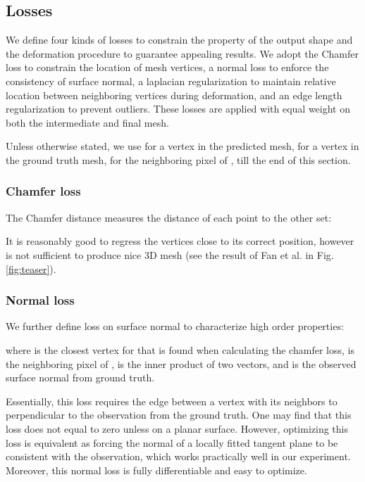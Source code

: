 \documentclass[runningheads]{llncs}
\newcommand{\figref}[1]{Fig. \ref{#1}}
\begin{document}
\subsection{Losses}
We define four kinds of losses to constrain the property of the output shape and the deformation procedure to guarantee appealing results.
We adopt the Chamfer loss \cite{FanSG16} to constrain the location of mesh vertices, a normal loss to enforce the consistency of surface normal, a laplacian regularization to maintain relative location between neighboring vertices during deformation, and an edge length regularization to prevent outliers. 
These losses are applied with equal weight on both the intermediate and final mesh.

Unless otherwise stated, we use  for a vertex in the predicted mesh,  for a vertex in the ground truth mesh,  for the neighboring pixel of , till the end of this section.





\subsubsection{Chamfer loss}
The Chamfer distance measures the distance of each point to the other set:

It is reasonably good to regress the vertices close to its correct position, however is not sufficient to produce nice 3D mesh (see the result of Fan et al. \cite{FanSG16} in \figref{fig:teaser}).

\subsubsection{Normal loss}
We further define loss on surface normal to characterize high order properties:

where  is the closest vertex for  that is found when calculating the chamfer loss,  is the neighboring pixel of ,  is the inner product of two vectors, and  is the observed surface normal from ground truth.

Essentially, this loss requires the edge between a vertex with its neighbors to perpendicular to the observation from the ground truth. 
One may find that this loss does not equal to zero unless on a planar surface.
However, optimizing this loss is equivalent as forcing the normal of a locally fitted tangent plane to be consistent with the observation, which works practically well in our experiment.
Moreover, this normal loss is fully differentiable and easy to optimize.
\end{document}
